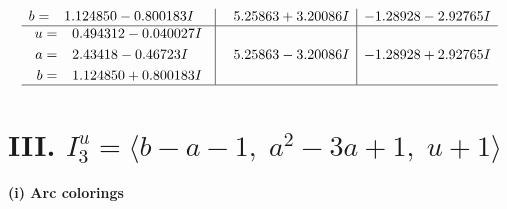 \documentclass[1p]{elsarticle_modified}
\theoremstyle{definition}
\begin{document}
$$\begin{array}{c|c|c}
\begin{aligned}
b &= \phantom{-}1.124850 - 0.800183 I\end{aligned}
 & \phantom{-}5.25863 + 3.20086 I & -1.28928 - 2.92765 I \\ \hline\begin{aligned}
u &= \phantom{-}0.494312 - 0.040027 I \\
a &= \phantom{-}2.43418 - 0.46723 I \\
b &= \phantom{-}1.124850 + 0.800183 I\end{aligned}
 & \phantom{-}5.25863 - 3.20086 I & -1.28928 + 2.92765 I\\
 \hline 
 \end{array}$$\newpage\newpage\renewcommand{\arraystretch}{1}
\centering \section*{III. $I^u_{3}= \langle b- a-1,\;a^2-3 a+1,\;u+1 \rangle$}
\flushleft \textbf{(i) Arc colorings}\\
\end{document}
